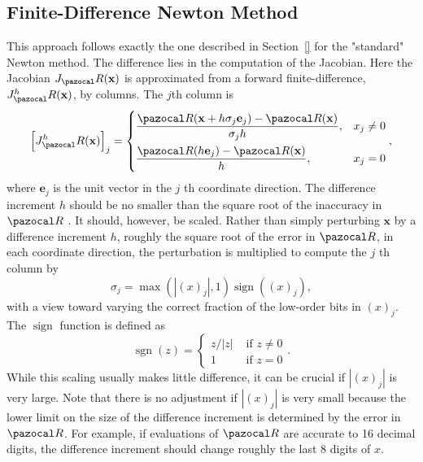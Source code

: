 
\subsection{Finite-Difference Newton Method}\label{sec:finite_difference_newton_method}

This approach follows exactly the one described in Section~\ref{} for the "standard" Newton method.
The difference lies in the computation of the Jacobian.
Here the Jacobian \(J_\pazocal R(\mathbf x)\) is approximated from a forward finite-difference, \(J^h_\pazocal R(\mathbf x)\), by columns.
The \(j\)th column is
\begin{equation}
\left[J^h_\pazocal R(\mathbf x)\right]_{j}=
\begin{cases}
  \displaystyle\frac{\pazocal R(\mathbf x + h \sigma_{j} \mathbf e_{j})-\pazocal R(\mathbf x)}{\sigma_{j} h}, & x_{j} \neq 0 \\[10pt]
  \displaystyle\frac{\pazocal R(h \mathbf e_{j})-\pazocal R(\mathbf x)}{h}, & x_{j}=0
\end{cases},
\end{equation}
where \(\mathbf e_{j}\) is the unit vector in the \(j\) th coordinate direction. 
The difference increment \(h\) should be no smaller than the square root of the inaccuracy in \(\pazocal R\) \citep{kelley}. 
It should, however, be scaled. 
Rather than simply perturbing \(\mathbf x\) by a difference increment \(h\), roughly the square root of the error in \(\pazocal R\), in each coordinate direction, the perturbation is multiplied to compute the \(j\) th column by
\begin{equation}
  \sigma_j = \max (|(x)_{j}|, 1) \operatorname{sign}((x)_{j}),
\end{equation}
with a view toward varying the correct fraction of the low-order bits in \((x)_{j}\).
The \(\operatorname{sign}\) function is defined as
\begin{equation}
  \operatorname{sgn}(z)=\begin{cases}
  z /|z| & \text { if } z \neq 0 \\
  1 & \text { if } z=0
  \end{cases}.
\end{equation}
While this scaling usually makes little difference, it can be crucial if \(|(x)_{j}|\) is very large. 
Note that there is no adjustment if \(|(x)_{j}|\) is very small because the lower limit on the size of the difference increment is determined by the error in \(\pazocal R\). 
For example, if evaluations of \(\pazocal R\) are accurate to 16 decimal digits, the difference increment should change roughly the last 8 digits of \(x\). \citep{kelley}

